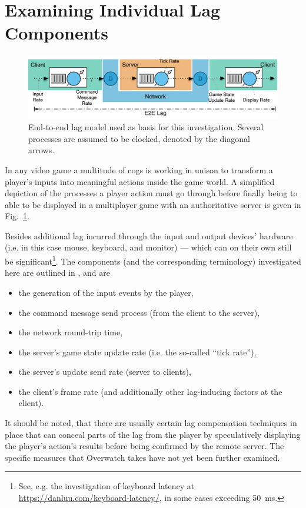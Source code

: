 \section{Examining Individual Lag Components}
\label{sec:lagmodel}

\begin{figure}[t]
	\centering
	\includegraphics[width=1.0\textwidth]{images/e2e-lag-model.pdf}
	\caption{End-to-end lag model used as basis for this investigation. Several processes are assumed to be clocked, denoted by the diagonal arrows.}
\label{fig:e2e-lag-model}
\end{figure}

In any video game a multitude of cogs is working in unison to transform a player's inputs into meaningful actions inside the game world. A simplified depiction of the processes a player action must go through before finally being to able to be displayed in a multiplayer game with an authoritative server is given in Fig.~\ref{fig:e2e-lag-model}. 

Besides additional lag incurred through the input and output devices' hardware (i.e. in this case mouse, keyboard, and monitor) --- which can on their own still be significant\footnote{See, e.g. the investigation of keyboard latency at \url{https://danluu.com/keyboard-latency/}, in some cases exceeding \SI{50}{\milli\second}.}. The components (and the corresponding terminology) investigated here are outlined in \cite{Metzger+2016}, and are 
%
\begin{itemize}
	\item the generation of the input events by the player,
	\item the command message send process (from the client to the server),
	\item the network round-trip time,
	\item the server's game state update rate (i.e. the so-called ``tick rate''),
	\item the server's update send rate (server to clients),
	\item the client's frame rate (and additionally other lag-inducing factors at the client).
\end{itemize}
%
It should be noted, that there are usually certain lag compensation techniques \cite{bernier2001latency} in place that can conceal parts of the lag from the player by speculatively displaying the player's action's results before being confirmed by the remote server. The specific measures that Overwatch takes have not yet been further examined.

